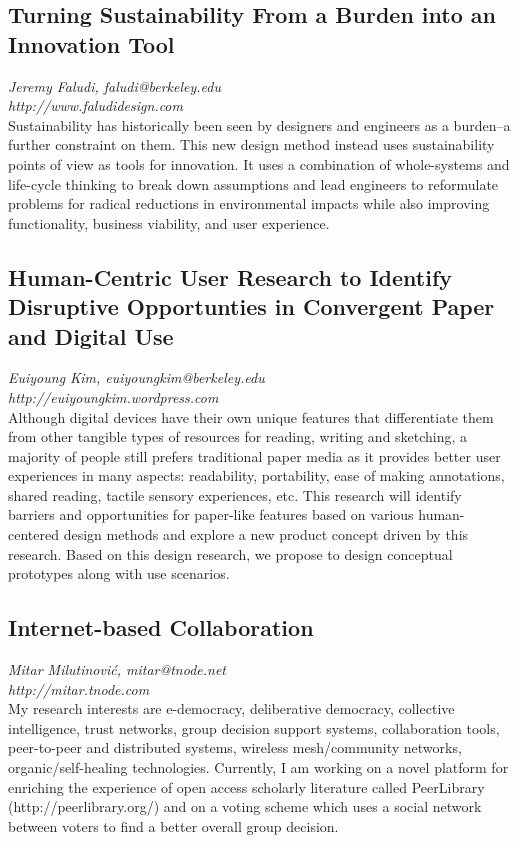 \documentclass[foldmark,10pt,a4paper,notumble]{leaflet}
\begin{document}
\subsection{Turning Sustainability From a Burden into an Innovation Tool}
\emph{Jeremy Faludi, faludi@berkeley.edu}\\
\emph{http://www.faludidesign.com}\\
Sustainability has historically been seen by designers and engineers as a burden--a further constraint on them.  This new design method instead uses sustainability points of view as tools for innovation.  It uses a combination of whole-systems and life-cycle thinking to break down assumptions and lead engineers to reformulate problems for radical reductions in environmental impacts while also improving functionality, business viability, and user experience.
\subsection{Human-Centric User Research to Identify Disruptive Opportunties in Convergent Paper and Digital Use}
\emph{Euiyoung Kim, euiyoungkim@berkeley.edu}\\
\emph{http://euiyoungkim.wordpress.com}\\
Although digital devices have their own unique features that differentiate them from other
tangible types of resources for reading, writing and sketching, a majority of people still prefers traditional
paper media as it provides better user experiences in many aspects: readability, portability, ease of
making annotations, shared reading, tactile sensory experiences, etc. This research will identify
barriers and opportunities for paper-like features based on various human-centered design methods and
explore a new product concept driven by this research. Based on this design research, we propose to
design conceptual prototypes along with use scenarios. 
\subsection{Internet-based Collaboration}
\emph{Mitar Milutinovi\'c, mitar@tnode.net}\\
\emph{http://mitar.tnode.com}\\
My research interests are e-democracy, deliberative democracy,
collective intelligence, trust networks, group decision support systems,
collaboration tools, peer-to-peer and distributed systems, wireless
mesh/community networks, organic/self-healing technologies. Currently, I
am working on a novel platform for enriching the experience of open
access scholarly literature called PeerLibrary (http://peerlibrary.org/)
and on a voting scheme which uses a social network between voters to
find a better overall group decision.
\end{document}
